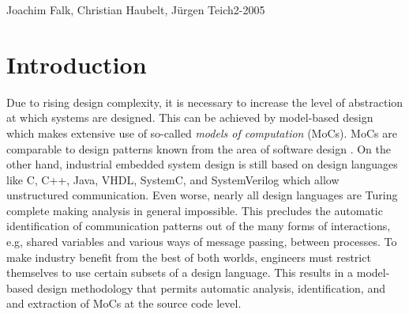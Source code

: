 \newcommand{\graphicPostfix}{pdf}



\newcommand{\code}[1]{\texttt{#1}}
\newcommand{\SysteMoC}{\mbox{\emph{SysteMoC}}}
\newcommand{\SysteMoCV}{\emph{SysteMoC 1.0}}
\newcommand{\implies}{\Longrightarrow}
\newcommand{\comment}[1]{}

\theoremheaderfont{\normalfont\sffamily\bfseries}
{\theorembodyfont{\normalfont\itshape}
  \newtheorem{sdefinition}{Definition}[section]
  \newtheorem{definition}{Definition}[subsection]
  \newtheorem{proof}{Proof}[subsection]
  \newtheorem{characteristic}{Characteristic}[subsection]
}
{\theorembodyfont{\normalfont}
  \newtheorem{sexample}{Example}[section]
  \newtheorem{example}{Example}[subsection]
}

\usepackage{multirow}
\usepackage{fancyvrb}
\usepackage{subfigure}

\makeatletter  %
\renewcommand{\verbatim@font}{%
  \ttfamily\small\catcode`\<=\active\catcode`\>=\active%
}
\makeatother   %




{Joachim Falk, Christian Haubelt, J\"urgen Teich}{2-2005}
\clearpage
\tableofcontents
\clearpage

\section{Introduction\label{intro}}

Due to rising design complexity, it is necessary to increase
the level of abstraction at which systems are designed.
This can be achieved by model-based design which makes extensive use
of so-called
\emph{models of computation} \cite{embsft:2002} (MoCs).
MoCs are comparable to design patterns known from the area of
software design \cite{gamma:1995}.
On the other hand, industrial embedded system design is still based on
design languages like C, C++, Java, VHDL, SystemC, and SystemVerilog which
allow unstructured communication.
Even worse, nearly all design languages are Turing
complete making analysis in general impossible.
This precludes the automatic identification of communication patterns
out of the many forms of interactions, e.g, shared variables and
various ways of message passing, between processes.
To make industry benefit from the best of both worlds,
engineers must restrict themselves to use certain subsets of
a design language. This results in a model-based design methodology
that permits automatic analysis, identification, and
and extraction of MoCs at the source code level.

